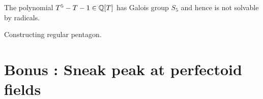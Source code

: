 \documentclass{article}
\begin{document}
\begin{prop}
  
  The polynomial $T^5 - T - 1 \in \mathbb{Q}[T]$ has Galois group $S_5$
  and hence is not solvable by radicals.
\end{prop}

\begin{prop}
  
\end{prop}

\begin{eg}
  Constructing regular pentagon.
\end{eg}

\begin{prop}
  
\end{prop}

\section{Bonus : Sneak peak at perfectoid fields}

\printbibliography
\end{document}
